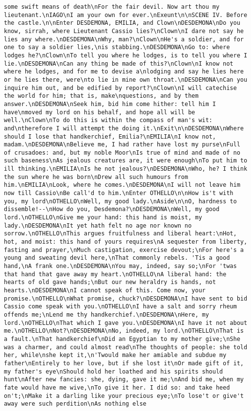 \begin{verbatim}
some swift means of death\nFor the fair devil. Now art thou my lieutenant.\nIAGO\nI am your own for ever.\nExeunt\n\nSCENE IV. Before the castle.\n\nEnter DESDEMONA, EMILIA, and Clown\nDESDEMONA\nDo you know, sirrah, where Lieutenant Cassio lies?\nClown\nI dare not say he lies any where.\nDESDEMONA\nWhy, man?\nClown\nHe's a soldier, and for one to say a soldier lies,\nis stabbing.\nDESDEMONA\nGo to: where lodges he?\nClown\nTo tell you where he lodges, is to tell you where I lie.\nDESDEMONA\nCan any thing be made of this?\nClown\nI know not where he lodges, and for me to devise a\nlodging and say he lies here or he lies there, were\nto lie in mine own throat.\nDESDEMONA\nCan you inquire him out, and be edified by report?\nClown\nI will catechise the world for him; that is, make\nquestions, and by them answer.\nDESDEMONA\nSeek him, bid him come hither: tell him I have\nmoved my lord on his behalf, and hope all will be well.\nClown\nTo do this is within the compass of man's wit: and\ntherefore I will attempt the doing it.\nExit\n\nDESDEMONA\nWhere should I lose that handkerchief, Emilia?\nEMILIA\nI know not, madam.\nDESDEMONA\nBelieve me, I had rather have lost my purse\nFull of crusadoes: and, but my noble Moor\nIs true of mind and made of no such baseness\nAs jealous creatures are, it were enough\nTo put him to ill thinking.\nEMILIA\nIs he not jealous?\nDESDEMONA\nWho, he? I think the sun where he was born\nDrew all such humours from him.\nEMILIA\nLook, where he comes.\nDESDEMONA\nI will not leave him now till Cassio\nBe call'd to him.\nEnter OTHELLO\n\nHow is't with you, my lord\nOTHELLO\nWell, my good lady.\nAside\n\nO, hardness to dissemble!--\nHow do you, Desdemona?\nDESDEMONA\nWell, my good lord.\nOTHELLO\nGive me your hand: this hand is moist, my lady.\nDESDEMONA\nIt yet hath felt no age nor known no sorrow.\nOTHELLO\nThis argues fruitfulness and liberal heart:\nHot, hot, and moist: this hand of yours requires\nA sequester from liberty, fasting and prayer,\nMuch castigation, exercise devout;\nFor here's a young and sweating devil here,\nThat commonly rebels. 'Tis a good hand,\nA frank one.\nDESDEMONA\nYou may, indeed, say so;\nFor 'twas that hand that gave away my heart.\nOTHELLO\nA liberal hand: the hearts of old gave hands;\nBut our new heraldry is hands, not hearts.\nDESDEMONA\nI cannot speak of this. Come now, your promise.\nOTHELLO\nWhat promise, chuck?\nDESDEMONA\nI have sent to bid Cassio come speak with you.\nOTHELLO\nI have a salt and sorry rheum offends me;\nLend me thy handkerchief.\nDESDEMONA\nHere, my lord.\nOTHELLO\nThat which I gave you.\nDESDEMONA\nI have it not about me.\nOTHELLO\nNot?\nDESDEMONA\nNo, indeed, my lord.\nOTHELLO\nThat is a fault.\nThat handkerchief\nDid an Egyptian to my mother give;\nShe was a charmer, and could almost read\nThe thoughts of people: she told her, while\nshe kept it,\n'Twould make her amiable and subdue my father\nEntirely to her love, but if she lost it\nOr made gift of it, my father's eye\nShould hold her loathed and his spirits should hunt\nAfter new fancies: she, dying, gave it me;\nAnd bid me, when my fate would have me wive,\nTo give it her. I did so: and take heed on't;\nMake it a darling like your precious eye;\nTo lose't or give't away were such perdition\nAs nothing else 
\end{verbatim}
